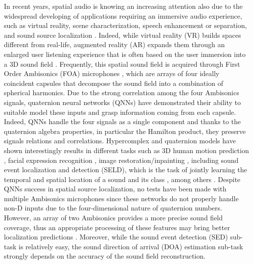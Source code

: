 \documentclass[3p, preprint, twocolumn]{elsarticle}
\begin{document}
In recent years, spatial audio is knowing an increasing attention also due to the widespread developing of applications requiring an immersive audio experience, such as virtual reality, scene characterization, speech enhancement or separation, and sound source localization \cite{Michelsanti2021TASLP, Manamperi2022TASLP, Comanducci2020TASLP, Cisneros2019VR}. Indeed, while virtual reality (VR) builds spaces different from real-life, augmented reality (AR) expands them through an enlarged user listening experience that is often based on the user immersion into a 3D sound field \cite{Kailas2021Springer, Majumder_2021_ICCV, Sundareswaran2003AR3D}. Frequently, this spatial sound field is acquired through First Order Ambisonics (FOA) 
microphones \cite{Saladnet2021, Mroz20216dof, Gotz2021Amb, guizzo2021l3das21, Guizzo2022L3DAS22CL}, which are arrays of four ideally coincident capsules that decompose the sound field into a combination of spherical harmonics. Due to the strong correlation among the four Ambisonics signals, quaternion neural networks (QNNs) have demonstrated their ability to suitable model these inputs and grasp information coming from each capsule. Indeed, QNNs handle the four signals as a single component and thanks to the quaternion algebra properties, in particular the Hamilton product, they preserve signals relations and correlations. Hypercomplex and quaternion models have shown interestingly results in different tasks such as 3D human motion prediction \cite{CAO2022141}, facial expression recognition \cite{Zhou2022TETCI}, image restoration/inpainting \cite{Huang2021QRestore, Jia2022TIP}, including sound event localization and detection (SELD), which is the task of jointly learning the temporal and spatial location of a sound and its class \cite{SELD, ComminielloICASSP2019b, Brignone2022ISCAS, QSSL, SalvatiIJCNN2020}, among others \cite{math10071083, NavarroMorenoR21, Chen2021Qfact, Guo2021QHyper, Zhang2022TNNLS}. Despite QNNs success in spatial source localization, no tests have been made with multiple Ambisonics microphones since these networks do not properly handle non-D inputs due to the four-dimensional nature of quaternion numbers. However, an array of two Ambisonics provides a more precise sound field coverage, thus an appropriate processing of these features may bring better localization predictions \cite{Poschadel2021EUSIPCO}. Moreover, while the sound event detection (SED) sub-task is relatively easy, the sound direction of arrival (DOA) estimation sub-task strongly depends on the accuracy of the sound field reconstruction.
\end{document}
